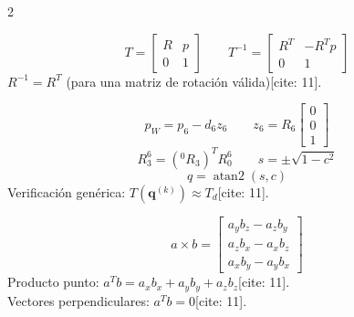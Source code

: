 \documentclass[10pt, a4paper]{article}
\begin{document}
\vspace{0.2cm}
\begin{multicols*}{2}
\small

\begin{tcolorbox}[sectionbox, title=Transformaciones Homogéneas{[cite: 11]}]
\begin{equation*}
    T= \begin{bmatrix} R & p \\ 0 & 1 \end{bmatrix} \qquad T^{-1} = \begin{bmatrix} R^T & -R^T p \\ 0 & 1 \end{bmatrix}
\end{equation*}
$R^{-1}=R^T$ (para una matriz de rotación válida)[cite: 11].
\end{tcolorbox}

\begin{tcolorbox}[sectionbox, title=Cinemática Inversa{[cite: 11]}]
\begin{equation*}
    p_W = p_6 - d_6 z_6 \qquad z_6 = R_6 \begin{bmatrix} 0 \\ 0 \\ 1 \end{bmatrix}
\end{equation*}
\begin{equation*}
    R_3^6 = ({}^0R_3)^T R_0^6 \qquad s = \pm\sqrt{1-c^2}
\end{equation*}
\begin{equation*}
    q = \operatorname{atan2}(s,c)
\end{equation*}
Verificación genérica: $\boxed{ T(\mathbf{q}^{(k)}) \approx T_d }$[cite: 11].
\end{tcolorbox}

\begin{tcolorbox}[sectionbox, title=Geometría Vectorial{[cite: 11]}]
\begin{equation*}
    a \times b = \begin{bmatrix} a_y b_z - a_z b_y \\ a_z b_x - a_x b_z \\ a_x b_y - a_y b_x \end{bmatrix}
\end{equation*}
Producto punto: $a^T b = a_x b_x + a_y b_y + a_z b_z$[cite: 11]. \\
Vectores perpendiculares: $a^T b = 0$[cite: 11].
\end{tcolorbox}


\end{multicols*}
\end{document}
